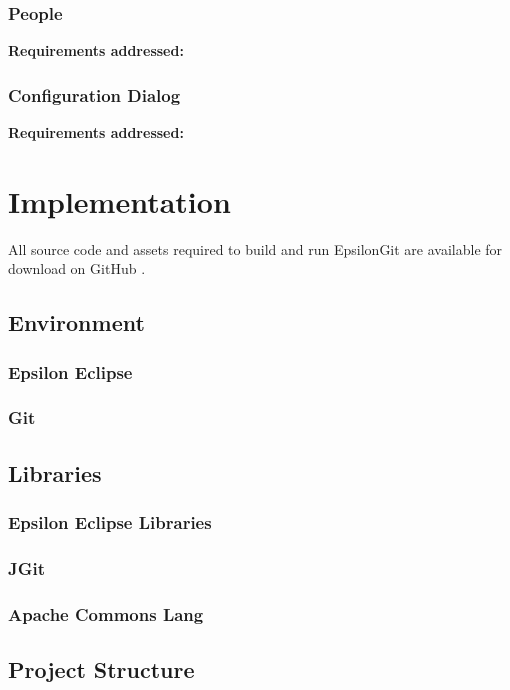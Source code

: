 \documentclass[11pt]{book}
\begin{document}
\subsection{People}
\begin{tcolorbox}
\textbf{Requirements addressed:}
\end{tcolorbox}

\subsection{Configuration Dialog}
\begin{tcolorbox}
\textbf{Requirements addressed:}
\end{tcolorbox}


\chapter{Implementation}

All source code and assets required to build and run EpsilonGit are available for download on GitHub \cite{epsilongitgithub}. 

\section{Environment}
\subsection{Epsilon Eclipse}
\subsection{Git}

\section{Libraries}
\subsection{Epsilon Eclipse Libraries}
\subsection{JGit}
\subsection{Apache Commons Lang}

\section{Project Structure}
\end{document}

